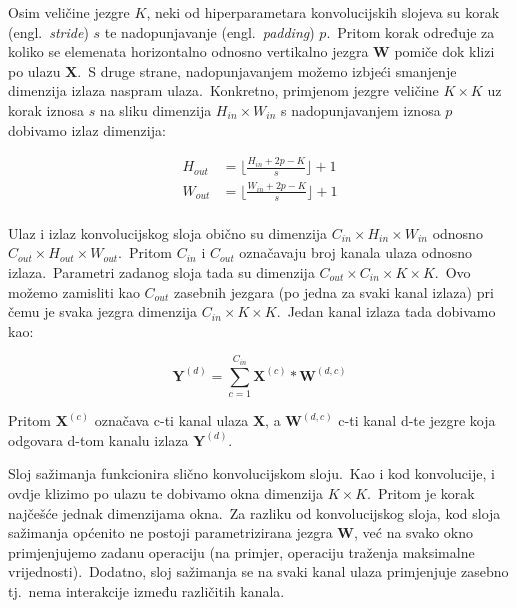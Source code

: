 \documentclass[diplomskirad]{fer}
\begin{document}
Osim veličine jezgre $K$, neki od hiperparametara konvolucijskih slojeva su korak (engl.\ \textit{stride}) $s$ te nadopunjavanje (engl.\ \textit{padding}) $p$.\ 
Pritom korak određuje za koliko se elemenata horizontalno odnosno vertikalno jezgra $\bm{W}$ pomiče dok klizi po ulazu $\bm{X}$.\ 
S druge strane, nadopunjavanjem možemo izbjeći smanjenje dimenzija izlaza naspram ulaza.\ Konkretno, primjenom jezgre veličine $K \times K$ uz korak iznosa $s$ na sliku dimenzija $H_{in} \times W_{in}$ s nadopunjavanjem iznosa $p$ dobivamo izlaz dimenzija:

\begin{equation}
  \begin{aligned}
    H_{out} &= \lfloor \frac{H_{in} + 2p - K}{s} \rfloor + 1 \\
    W_{out} &= \lfloor \frac{W_{in} + 2p - K}{s} \rfloor + 1\\ 
  \end{aligned}
  \label{eq:output_size}
\end{equation}

Ulaz i izlaz konvolucijskog sloja obično su dimenzija $C_{in} \times H_{in} \times W_{in}$ odnosno $C_{out} \times H_{out} \times W_{out}$.\ Pritom $C_{in}$ i $C_{out}$ označavaju broj kanala ulaza odnosno izlaza.\ 
Parametri zadanog sloja tada su dimenzija $C_{out} \times C_{in} \times K \times K$.\ Ovo možemo zamisliti kao $C_{out}$ zasebnih jezgara (po jedna za svaki kanal izlaza) pri čemu je svaka jezgra dimenzija $C_{in} \times K \times K$.\ Jedan kanal izlaza tada dobivamo kao:

\begin{equation}
  \bm{Y}^{(d)} = \sum_{c=1}^{C_{in}} \bm{X}^{(c)} * \bm{W}^{(d, c)}
  \label{eq:conv_multi}
\end{equation}

Pritom $\bm{X}^{(c)}$ označava c-ti kanal ulaza $\bm{X}$, a $\bm{W}^{(d, c)}$ c-ti kanal d-te jezgre koja odgovara d-tom kanalu izlaza $\bm{Y}^{(d)}$.\ 

Sloj sažimanja funkcionira slično konvolucijskom sloju.\ Kao i kod konvolucije, i ovdje klizimo po ulazu te dobivamo okna dimenzija $K \times K$.\ Pritom je korak najčešće jednak dimenzijama okna.\ 
Za razliku od konvolucijskog sloja, kod sloja sažimanja općenito ne postoji parametrizirana jezgra $\bm{W}$, već na svako okno primjenjujemo zadanu operaciju (na primjer, operaciju traženja maksimalne vrijednosti).\ 
Dodatno, sloj sažimanja se na svaki kanal ulaza primjenjuje zasebno tj.\ nema interakcije između različitih kanala.\ 
\end{document}
